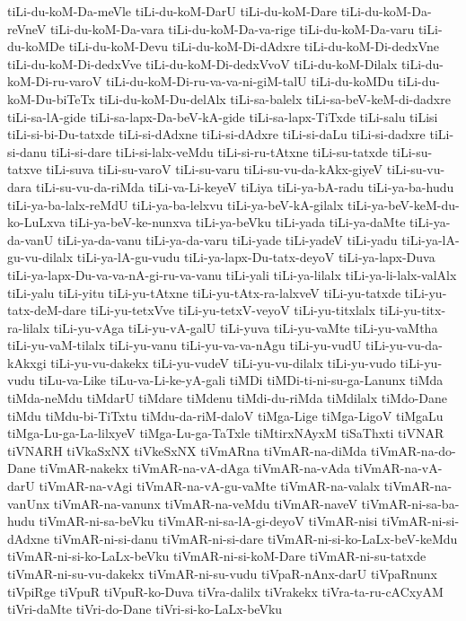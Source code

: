 {tiLi-du-koM-Da-meVle
tiLi-du-koM-DarU
tiLi-du-koM-Dare
tiLi-du-koM-Da-reVneV
tiLi-du-koM-Da-vara
tiLi-du-koM-Da-va-rige
tiLi-du-koM-Da-varu
tiLi-du-koMDe
tiLi-du-koM-Devu
tiLi-du-koM-Di-dAdxre
tiLi-du-koM-Di-dedxVne
tiLi-du-koM-Di-dedxVve
tiLi-du-koM-Di-dedxVvoV
tiLi-du-koM-Dilalx
tiLi-du-koM-Di-ru-varoV
tiLi-du-koM-Di-ru-va-va-ni-giM-talU
tiLi-du-koMDu
tiLi-du-koM-Du-biTeTx
tiLi-du-koM-Du-delAlx
tiLi-sa-balelx
tiLi-sa-beV-keM-di-dadxre
tiLi-sa-lA-gide
tiLi-sa-lapx-Da-beV-kA-gide
tiLi-sa-lapx-TiTxde
tiLi-salu
tiLisi
tiLi-si-bi-Du-tatxde
tiLi-si-dAdxne
tiLi-si-dAdxre
tiLi-si-daLu
tiLi-si-dadxre
tiLi-si-danu
tiLi-si-dare
tiLi-si-lalx-veMdu
tiLi-si-ru-tAtxne
tiLi-su-tatxde
tiLi-su-tatxve
tiLi-suva
tiLi-su-varoV
tiLi-su-varu
tiLi-su-vu-da-kAkx-giyeV
tiLi-su-vu-dara
tiLi-su-vu-da-riMda
tiLi-va-Li-keyeV
tiLiya
tiLi-ya-bA-radu
tiLi-ya-ba-hudu
tiLi-ya-ba-lalx-reMdU
tiLi-ya-ba-lelxvu
tiLi-ya-beV-kA-gilalx
tiLi-ya-beV-keM-du-ko-LuLxva
tiLi-ya-beV-ke-nunxva
tiLi-ya-beVku
tiLi-yada
tiLi-ya-daMte
tiLi-ya-da-vanU
tiLi-ya-da-vanu
tiLi-ya-da-varu
tiLi-yade
tiLi-yadeV
tiLi-yadu
tiLi-ya-lA-gu-vu-dilalx
tiLi-ya-lA-gu-vudu
tiLi-ya-lapx-Du-tatx-deyoV
tiLi-ya-lapx-Duva
tiLi-ya-lapx-Du-va-va-nA-gi-ru-va-vanu
tiLi-yali
tiLi-ya-lilalx
tiLi-ya-li-lalx-valAlx
tiLi-yalu
tiLi-yitu
tiLi-yu-tAtxne
tiLi-yu-tAtx-ra-lalxveV
tiLi-yu-tatxde
tiLi-yu-tatx-deM-dare
tiLi-yu-tetxVve
tiLi-yu-tetxV-veyoV
tiLi-yu-titxlalx
tiLi-yu-titx-ra-lilalx
tiLi-yu-vAga
tiLi-yu-vA-galU
tiLi-yuva
tiLi-yu-vaMte
tiLi-yu-vaMtha
tiLi-yu-vaM-tilalx
tiLi-yu-vanu
tiLi-yu-va-va-nAgu
tiLi-yu-vudU
tiLi-yu-vu-da-kAkxgi
tiLi-yu-vu-dakekx
tiLi-yu-vudeV
tiLi-yu-vu-dilalx
tiLi-yu-vudo
tiLi-yu-vudu
tiLu-va-Like
tiLu-va-Li-ke-yA-gali
tiMDi
tiMDi-ti-ni-su-ga-Lanunx
tiMda
tiMda-neMdu
tiMdarU
tiMdare
tiMdenu
tiMdi-du-riMda
tiMdilalx
tiMdo-Dane
tiMdu
tiMdu-bi-TiTxtu
tiMdu-da-riM-daloV
tiMga-Lige
tiMga-LigoV
tiMgaLu
tiMga-Lu-ga-La-lilxyeV
tiMga-Lu-ga-TaTxle
tiMtirxNAyxM
tiSaThxti
tiVNAR
tiVNARH
tiVkaSxNX
tiVkeSxNX
tiVmARna
tiVmAR-na-diMda
tiVmAR-na-do-Dane
tiVmAR-nakekx
tiVmAR-na-vA-dAga
tiVmAR-na-vAda
tiVmAR-na-vA-darU
tiVmAR-na-vAgi
tiVmAR-na-vA-gu-vaMte
tiVmAR-na-valalx
tiVmAR-na-vanUnx
tiVmAR-na-vanunx
tiVmAR-na-veMdu
tiVmAR-naveV
tiVmAR-ni-sa-ba-hudu
tiVmAR-ni-sa-beVku
tiVmAR-ni-sa-lA-gi-deyoV
tiVmAR-nisi
tiVmAR-ni-si-dAdxne
tiVmAR-ni-si-danu
tiVmAR-ni-si-dare
tiVmAR-ni-si-ko-LaLx-beV-keMdu
tiVmAR-ni-si-ko-LaLx-beVku
tiVmAR-ni-si-koM-Dare
tiVmAR-ni-su-tatxde
tiVmAR-ni-su-vu-dakekx
tiVmAR-ni-su-vudu
tiVpaR-nAnx-darU
tiVpaRnunx
tiVpiRge
tiVpuR
tiVpuR-ko-Duva
tiVra-dalilx
tiVrakekx
tiVra-ta-ru-cACxyAM
tiVri-daMte
tiVri-do-Dane
tiVri-si-ko-LaLx-beVku
}
